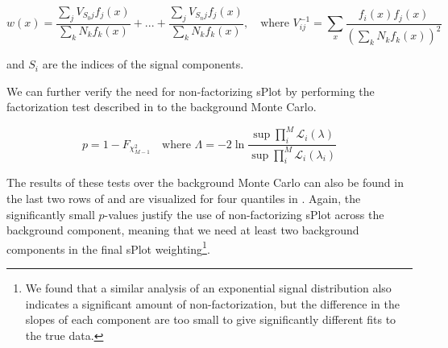 \begin{equation}
  w(x) = \frac{\sum_{j} V_{S_0 j}f_j(x)}{\sum_{k}N_kf_k(x)} + ... + \frac{\sum_{j} V_{S_n j}f_j(x)}{\sum_{k}N_kf_k(x)},\quad \text{where } V_{ij}^{-1} = \sum_{x} \frac{f_i(x)f_j(x)}{\left(\sum_{k} N_kf_k(x)\right)^2}
  \label{eq:splot-weights-factorizing}
\end{equation}

and $S_i$ are the indices of the signal components.

We can further verify the need for non-factorizing sPlot by performing the factorization test described in  to the background Monte Carlo.

\begin{equation}
  p = 1 - F_{\chi^2_{M-1}} \quad\text{where }\Lambda = -2\ln\frac{\sup\prod_i^M \mathcal{L}_i(\lambda)}{\sup\prod_i^M \mathcal{L}_i(\lambda_i)}
  \label{eq:independence-test-mc}
\end{equation}

The results of these tests over the background Monte Carlo can also be found in the last two rows of  and are visualized for four quantiles in . Again, the significantly small $p$-values justify the use of non-factorizing sPlot across the background component, meaning that we need at least two background components in the final sPlot weighting\footnote{We found that a similar analysis of an exponential signal distribution also indicates a significant amount of non-factorization, but the difference in the slopes of each component are too small to give significantly different fits to the true data.}.

